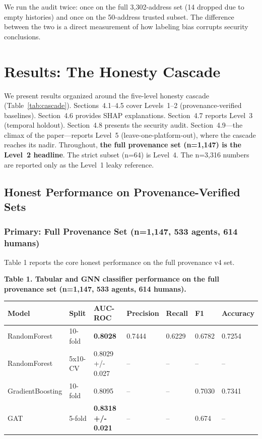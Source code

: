 \documentclass[sigconf,nonacm=false]{acmart}
\begin{document}
We run the audit twice: once on the full 3,302-address set (14 dropped due to empty histories) and once on the 50-address trusted subset. The difference between the two is a direct measurement of how labeling bias corrupts security conclusions.


\section{Results: The Honesty Cascade}

We present results organized around the five-level honesty cascade (Table~\ref{tab:cascade}). Sections~4.1--4.5 cover Levels~1--2 (provenance-verified baselines). Section~4.6 provides SHAP explanations. Section~4.7 reports Level~3 (temporal holdout). Section~4.8 presents the security audit. Section~4.9---the climax of the paper---reports Level~5 (leave-one-platform-out), where the cascade reaches its nadir. Throughout, \textbf{the full provenance set (n=1,147) is the Level~2 headline}. The strict subset (n=64) is Level~4. The n=3,316 numbers are reported only as the Level~1 leaky reference.

\subsection{Honest Performance on Provenance-Verified Sets}

\subsubsection{Primary: Full Provenance Set (n=1,147, 533 agents, 614 humans)}

Table 1 reports the core honest performance on the full provenance v4 set.

\textbf{Table 1. Tabular and GNN classifier performance on the full provenance set (n=1,147, 533 agents, 614 humans).}

\begin{table}[h]
\centering
\small
\begin{tabular}{lllllll}
\toprule
Model & Split & AUC-ROC & Precision & Recall & F1 & Accuracy \\
\midrule
RandomForest & 10-fold & \textbf{0.8028} & 0.7444 & 0.6229 & 0.6782 & 0.7254 \\
RandomForest & 5x10-CV & 0.8029 +/- 0.027 & -- & -- & -- & -- \\
GradientBoosting & 10-fold & 0.8095 & -- & -- & 0.7030 & 0.7341 \\
GAT & 5-fold & \textbf{0.8318 +/- 0.021} & -- & -- & 0.674 & -- \\
\bottomrule
\end{tabular}
\end{table}
\end{document}
